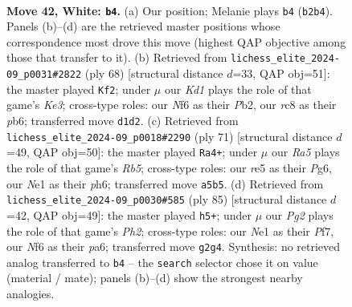 \documentclass[11pt]{article}
\begin{document}
\clearpage

\begin{figure}[p]\centering
\begin{subfigure}{0.46\textwidth}\centering
\resizebox{\linewidth}{!}{%
\newchessgame
\chessboard[
  setfen={2r5/1k3B2/5N2/Rb2rp2/7R/8/1P4P1/3KN3 w - - 1 42},
  showmover=false,
  pgfstyle=straightmove, color=movearrow, markmove={b2-b4}
]}
\caption{}
\end{subfigure}\hfill
\begin{subfigure}{0.46\textwidth}\centering
\resizebox{\linewidth}{!}{%
\newchessgame
\chessboard[
  setfen={6k1/2R5/1pb5/8/2r3p1/2N1K3/PP6/8 w - - 0 35},
  showmover=false,
  pgfstyle=straightmove, color=movearrow, markmove={e3-f2}
]}
\caption{}
\end{subfigure}
\\[4pt]
\begin{subfigure}{0.46\textwidth}\centering
\resizebox{\linewidth}{!}{%
\newchessgame
\chessboard[
  setfen={8/4k3/6pP/P1p2n2/1rB2R2/4r3/K7/7R b - - 0 36},
  showmover=false,
  pgfstyle=straightmove, color=movearrow, markmove={b4-a4}
]}
\caption{}
\end{subfigure}\hfill
\begin{subfigure}{0.46\textwidth}\centering
\resizebox{\linewidth}{!}{%
\newchessgame
\chessboard[
  setfen={4k3/1R3p1p/PB6/1r6/2n3K1/8/5P1P/8 b - - 0 43},
  showmover=false,
  pgfstyle=straightmove, color=movearrow, markmove={h7-h5}
]}
\caption{}
\end{subfigure}
\caption{\textbf{Move 42, White: \texttt{b4}.} (a) Our position; Melanie plays \texttt{b4} (\texttt{b2b4}). Panels (b)--(d) are the retrieved master positions whose correspondence most drove this move (highest QAP objective among those that transfer to it). (b) Retrieved from \texttt{lichess\_elite\_2024-09\_p0031\#2822} (ply 68) [structural distance $d$=33, QAP obj=51]: the master played \texttt{Kf2}; under $\mu$ our \emph{Kd1} plays the role of that game's \emph{Ke3}; cross-type roles: our \emph{N}f6 as their \emph{P}b2, our \emph{r}c8 as their \emph{p}b6; transferred move \texttt{d1d2}. (c) Retrieved from \texttt{lichess\_elite\_2024-09\_p0018\#2290} (ply 71) [structural distance $d$=49, QAP obj=50]: the master played \texttt{Ra4+}; under $\mu$ our \emph{Ra5} plays the role of that game's \emph{Rb5}; cross-type roles: our \emph{r}e5 as their \emph{P}g6, our \emph{N}e1 as their \emph{p}h6; transferred move \texttt{a5b5}. (d) Retrieved from \texttt{lichess\_elite\_2024-09\_p0030\#585} (ply 85) [structural distance $d$=42, QAP obj=49]: the master played \texttt{h5+}; under $\mu$ our \emph{Pg2} plays the role of that game's \emph{Ph2}; cross-type roles: our \emph{N}e1 as their \emph{P}f7, our \emph{N}f6 as their \emph{p}a6; transferred move \texttt{g2g4}. Synthesis: no retrieved analog transferred to \texttt{b4} -- the \texttt{search} selector chose it on value (material / mate); panels (b)--(d) show the strongest nearby analogies.}
\label{fig:thought-m82}
\end{figure}
\end{document}
